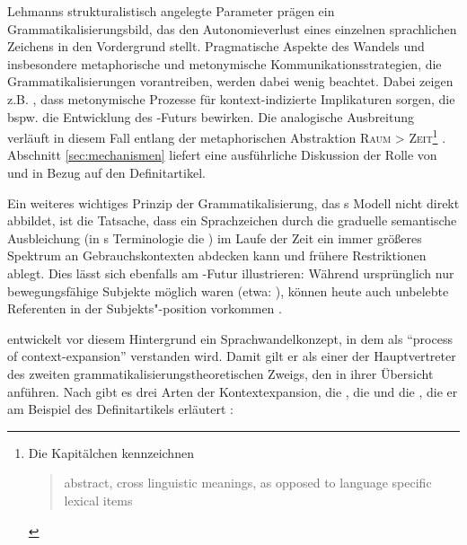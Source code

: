 Lehmanns strukturalistisch angelegte Parameter  prägen ein Grammatikalisierungsbild, das den Autonomieverlust eines einzelnen sprachlichen Zeichens in den Vordergrund stellt. Pragmatische Aspekte des Wandels und insbesondere metaphorische  und metonymische  Kommunikationsstrategien, die Grammatikalisierungen  vorantreiben, werden dabei wenig beachtet. Dabei zeigen z.B. \textcite[84--93]{Hopper2006}, dass metonymische  Prozesse für kontext-indizierte Implikaturen sorgen, die bspw. die Entwicklung des -Futurs bewirken. Die analogische Ausbreitung  verläuft in diesem Fall entlang der metaphorischen  Abstraktion \textsc{Raum > Zeit}\footnote{Die Kapitälchen kennzeichnen \blockcquote[85]{Hopper2006}{abstract, cross linguistic meanings, as opposed to language specific lexical items}.} \parencite[s. auch][45--46]{Heine1991}. Abschnitt \ref{sec:mechanismen} liefert eine ausführliche Diskussion der Rolle von  und  in Bezug auf den Definitartikel. 

Ein weiteres wichtiges Prinzip der Grammatikalisierung, das \citeauthor{Lehmann1995}s Modell nicht direkt abbildet, ist die Tatsache, dass ein Sprachzeichen durch die graduelle semantische Ausbleichung  (in \citeauthor{Lehmann1995}s  Terminologie die ) im Laufe der Zeit ein immer größeres Spektrum an Gebrauchskontexten abdecken kann und frühere Restriktionen ablegt. Dies lässt sich ebenfalls am -Futur illustrieren: Während ursprünglich  nur bewegungsfähige Subjekte  möglich waren (etwa: ), können heute auch unbelebte Referenten  in der Subjekts"-position vorkommen  \parencite[etwa: ; Beispiele nach][5--6]{Bybee1994}. 

\textcite{Himmelmann1997,Himmelmann2004} entwickelt vor diesem Hintergrund ein Sprachwandelkonzept, in dem  als "`process of context-expansion"'\linebreak \parencite[32]{Himmelmann2004} verstanden wird. Damit gilt er als einer der Hauptvertreter des zweiten grammatikalisierungstheoretischen Zweigs, den \textcite[105--109]{Traugott2013} in ihrer Übersicht anführen. Nach \citeauthor{Himmelmann2004} gibt es drei Arten der Kontextexpansion, die  , die  und die , die er am Beispiel des Definitartikels erläutert \parencite[s.][32--33]{Himmelmann2004}: 


